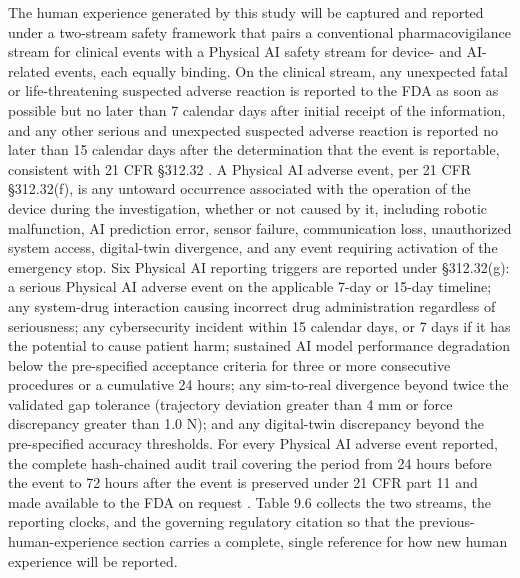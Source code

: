 The human experience generated by this study will be captured and reported under a
two-stream safety framework that pairs a conventional pharmacovigilance stream for
clinical events with a Physical AI safety stream for device- and AI-related events,
each equally binding. On the clinical stream, any unexpected fatal or
life-threatening suspected adverse reaction is reported to the FDA as soon as
possible but no later than 7 calendar days after initial receipt of the
information, and any other serious and unexpected suspected adverse reaction is
reported no later than 15 calendar days after the determination that the event is
reportable, consistent with 21 CFR \S 312.32 \cite{cfr312paiuni}. A Physical AI
adverse event, per 21 CFR \S 312.32(f), is any untoward occurrence associated with
the operation of the device during the investigation, whether or not caused by it,
including robotic malfunction, AI prediction error, sensor failure, communication
loss, unauthorized system access, digital-twin divergence, and any event requiring
activation of the emergency stop. Six Physical AI reporting triggers are reported
under \S 312.32(g): a serious Physical AI adverse event on the applicable 7-day or
15-day timeline; any system-drug interaction causing incorrect drug administration
regardless of seriousness; any cybersecurity incident within 15 calendar days, or
7 days if it has the potential to cause patient harm; sustained AI model
performance degradation below the pre-specified acceptance criteria for three or
more consecutive procedures or a cumulative 24 hours; any sim-to-real divergence
beyond twice the validated gap tolerance (trajectory deviation greater than 4 mm or
force discrepancy greater than 1.0 N); and any digital-twin discrepancy beyond the
pre-specified accuracy thresholds. For every Physical AI adverse event reported,
the complete hash-chained audit trail covering the period from 24 hours before the
event to 72 hours after the event is preserved under 21 CFR part 11 and made
available to the FDA on request \cite{cfr312paiuni, cfr050paiuni}. Table 9.6
collects the two streams, the reporting clocks, and the governing regulatory
citation so that the previous-human-experience section carries a complete, single
reference for how new human experience will be reported.

